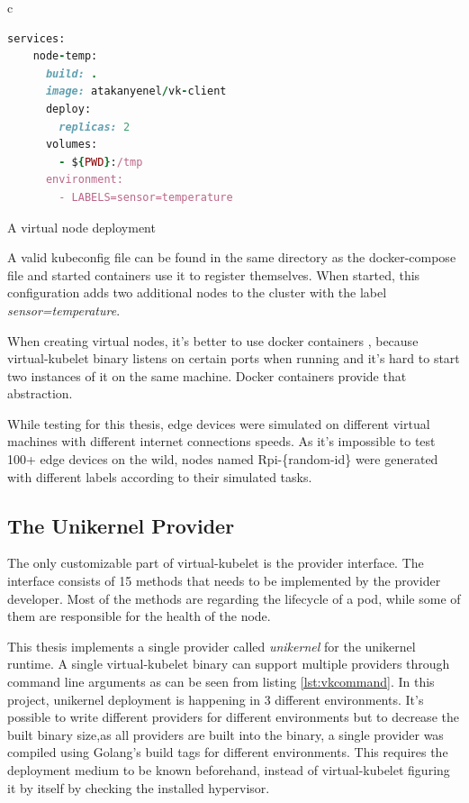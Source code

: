\begin{code}[htpb]
  \centering
  \begin{tabular}{c}
  \begin{lstlisting}[language=ruby]
    services:
    node-temp:
      build: .
      image: atakanyenel/vk-client
      deploy:
        replicas: 2
      volumes:
        - ${PWD}:/tmp
      environment:
        - LABELS=sensor=temperature
\end{lstlisting}
\end{tabular}
\caption{A virtual node deployment}\label{fig:docker-compose}
\end{code}


A valid kubeconfig file can be found in the same directory as the docker-compose file and started containers use it to register themselves. When started, this configuration adds two additional nodes to the cluster with the label \textit{sensor=temperature}.

When creating virtual nodes, it's better to use docker containers , because virtual-kubelet binary listens on certain ports when running and it's hard to start two instances of it on the same machine. Docker containers provide that abstraction.

While testing for this thesis, edge devices were simulated on different virtual machines with different internet connections speeds. As it's impossible to test 100+ edge devices on the wild, nodes named Rpi-\{random-id\} were generated with different labels according to their simulated tasks.

\subsection{The Unikernel Provider}
The only customizable part of virtual-kubelet is the provider interface. The interface consists of 15 methods that needs to be implemented by the provider developer. Most of the methods are regarding the lifecycle of a pod, while some of them are responsible for the health of the node. 

This thesis implements a single provider called \textit{unikernel} for the unikernel runtime. A single virtual-kubelet binary can support multiple providers through command line arguments as can be seen from listing \ref{lst:vkcommand}. In this project, unikernel deployment is happening in 3 different environments. It's possible to write different providers for different environments but to decrease the built binary size,as all providers are built into the binary, a single provider was compiled using Golang's build tags for different environments. This requires the deployment medium to be known beforehand, instead of virtual-kubelet figuring it by itself by checking the installed hypervisor.

